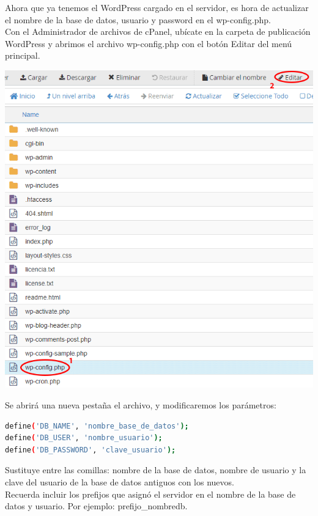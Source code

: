 \begin{enumerate}
		Ahora que ya tenemos el WordPress cargado en el servidor, es hora de actualizar el nombre de la base de datos, usuario y password  en el wp-config.php.\\
		
		Con el Administrador de archivos de cPanel, ubícate en la carpeta de publicación WordPress y abrimos el archivo wp-config.php con el botón Editar del menú principal.
		
		\begin{center}
			\includegraphics[scale=0.4]{image/migra19.png}
		\end{center}
		
		Se abrirá una nueva pestaña el archivo, y modificaremos los parámetros:
		\begin{lstlisting}[language=sh]
define('DB_NAME', 'nombre_base_de_datos');
define('DB_USER', 'nombre_usuario');
define('DB_PASSWORD', 'clave_usuario');
		\end{lstlisting}
		
		Sustituye entre las comillas: nombre de la base de datos, nombre de usuario y la clave del usuario de la base de datos antiguos con los nuevos.\\
		
		Recuerda incluir los prefijos que asignó el servidor en el nombre de la base de datos y usuario. Por ejemplo: prefijo\_nombredb.\\
		

\end{enumerate}
